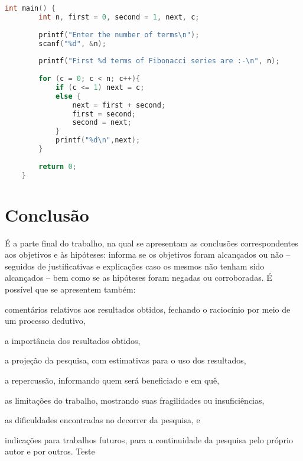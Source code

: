 \documentclass[12pt,oneside,a4paper,chapter=TITLE,section=TITLE,sumario
=tradicional]{abntex2}
\begin{document}
\begin{codigo}[htb]
    \begin{lstlisting}[language=C]
    int main() {
        int n, first = 0, second = 1, next, c;
        
        printf("Enter the number of terms\n");
        scanf("%d", &n);
        
        printf("First %d terms of Fibonacci series are :-\n", n);
        
        for (c = 0; c < n; c++){
            if (c <= 1) next = c;
            else {
                next = first + second;
                first = second;
                second = next;
            }
            printf("%d\n",next);
        }
        
        return 0;
    }
    \end{lstlisting}
    
    \fonteautor
\end{codigo}


\chapter{Conclusão}

É a parte final do trabalho, na qual se apresentam as conclusões 
correspondentes aos objetivos e às hipóteses: informa se os objetivos foram 
alcançados ou não – seguidos de justificativas e explicações caso os mesmos não 
tenham sido alcançados – bem como se as hipóteses foram negadas ou 
corroboradas. É possível que se apresentem também:

\begin{lista}
    \item comentários relativos aos resultados obtidos, fechando o raciocínio 
    por meio de um processo dedutivo,
    
    \item a importância dos resultados obtidos,
    
    \item a projeção da pesquisa, com estimativas para o uso dos resultados,
    
    \item a repercussão, informando quem será beneficiado e em quê,
    
    \item as limitações do trabalho, mostrando suas fragilidades ou
insuficiências,
    \item as dificuldades encontradas no decorrer da pesquisa, e
    \item indicações para trabalhos futuros, para a continuidade da
pesquisa pelo próprio autor e por outros. Teste
\end{lista}
\end{document}
